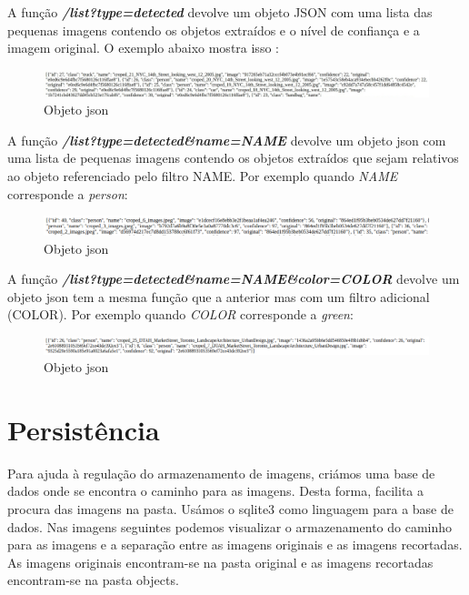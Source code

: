\documentclass{report}
\begin{document}
A função \textbf{\textit{/list?type=detected}} devolve um objeto JSON com uma lista das pequenas imagens contendo os objetos extraídos e o nível de confiança e a imagem original. O exemplo abaixo mostra isso :

\vspace{5 mm}
\begin{figure}[!ht]
    \centering
    \includegraphics[scale = 0.3]{detect.jpg}
    \caption{Objeto \ac{json}}
    \label{fig:my_label}
\end{figure}

A função  \textbf{\textit{/list?type=detected\&name=NAME}} devolve um objeto \ac{json} com uma lista de pequenas imagens contendo os objetos extraídos que sejam relativos ao objeto referenciado pelo filtro NAME.
Por exemplo quando \textit{NAME} corresponde a \textit{person}:
\vspace{5 mm}
\begin{figure}[!ht]
    \centering
    \includegraphics[scale = 0.3]{person.png}
    \caption{Objeto \ac{json}}
    \label{fig:my_label}
\end{figure}

A função  \textbf{\textit{/list?type=detected\&name=NAME\&color=COLOR}} devolve um objeto \ac{json} tem a mesma função que a anterior mas com um filtro adicional (COLOR).
Por exemplo quando \textit{COLOR} corresponde a \textit{green}:
\vspace{5 mm}
\begin{figure}[!ht]
    \centering
    \includegraphics[scale = 0.3]{green.png}
    \caption{Objeto \ac{json}}
    \label{fig:my_label}
\end{figure}


\chapter{Persistência}
\label{chap.persistencia}
Para ajuda à regulação do armazenamento de imagens, criámos uma base de dados onde se encontra o caminho para as imagens. Desta forma, facilita a procura das imagens na pasta. Usámos o sqlite3 como linguagem para a base de dados. Nas imagens seguintes podemos visualizar o armazenamento do caminho para as imagens e a separação entre as imagens originais e as imagens recortadas. As imagens originais encontram-se na pasta original e as imagens recortadas encontram-se na pasta objects.
\end{document}
